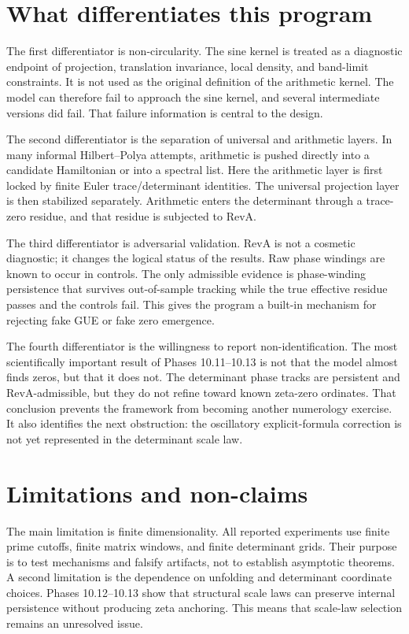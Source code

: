 \documentclass[11pt]{article}
\theoremstyle{definition}
\theoremstyle{plain}
\begin{document}
\section{What differentiates this program}

The first differentiator is non-circularity.  The sine kernel is treated as a diagnostic endpoint of projection, translation invariance, local density, and band-limit constraints.  It is not used as the original definition of the arithmetic kernel.  The model can therefore fail to approach the sine kernel, and several intermediate versions did fail.  That failure information is central to the design.

The second differentiator is the separation of universal and arithmetic layers.  In many informal Hilbert--Polya attempts, arithmetic is pushed directly into a candidate Hamiltonian or into a spectral list.  Here the arithmetic layer is first locked by finite Euler trace/determinant identities.  The universal projection layer is then stabilized separately.  Arithmetic enters the determinant through a trace-zero residue, and that residue is subjected to RevA.

The third differentiator is adversarial validation.  RevA is not a cosmetic diagnostic; it changes the logical status of the results.  Raw phase windings are known to occur in controls.  The only admissible evidence is phase-winding persistence that survives out-of-sample tracking while the true effective residue passes and the controls fail.  This gives the program a built-in mechanism for rejecting fake GUE or fake zero emergence.

The fourth differentiator is the willingness to report non-identification.  The most scientifically important result of Phases 10.11--10.13 is not that the model almost finds zeros, but that it does not.  The determinant phase tracks are persistent and RevA-admissible, but they do not refine toward known zeta-zero ordinates.  That conclusion prevents the framework from becoming another numerology exercise.  It also identifies the next obstruction: the oscillatory explicit-formula correction is not yet represented in the determinant scale law.

\section{Limitations and non-claims}

The main limitation is finite dimensionality.  All reported experiments use finite prime cutoffs, finite matrix windows, and finite determinant grids.  Their purpose is to test mechanisms and falsify artifacts, not to establish asymptotic theorems.  A second limitation is the dependence on unfolding and determinant coordinate choices.  Phases 10.12--10.13 show that structural scale laws can preserve internal persistence without producing zeta anchoring.  This means that scale-law selection remains an unresolved issue.
\end{document}
